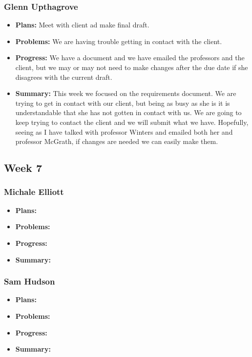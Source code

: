 \documentclass[onecolumn, draftclsnofoot,10pt, compsoc]{IEEEtran}
\begin{document}
\subsubsection{Glenn Upthagrove}
\begin {itemize}
 \item \textbf{Plans: }Meet with client ad make final draft. 
 \item \textbf{Problems: }We are having trouble getting in contact with the client.
 \item \textbf{Progress: }We have a document and we have emailed the professors and the client, but we may or may not need to make changes after the due date if she disagrees with the current draft.
 \item \textbf{Summary: }This week we focused on the requirements document. We are trying to get in contact with our client, but being as busy as she is it is understandable that she has not gotten in contact with us. We are going to keep trying to contact the client and we will submit what we have. Hopefully, seeing as I have talked with professor Winters and emailed both her and professor McGrath, if changes are needed we can easily make them.  
\end {itemize}
\subsection {Week 7}
\subsubsection{Michale Elliott}
\begin {itemize}
 \item \textbf{Plans: }
 \item \textbf{Problems: }
 \item \textbf{Progress: }
 \item \textbf{Summary: }
\end {itemize}
\subsubsection{Sam Hudson}
\begin {itemize}
 \item \textbf{Plans: }
 \item \textbf{Problems: }
 \item \textbf{Progress: }
 \item \textbf{Summary: }
\end {itemize}
\end{document}
